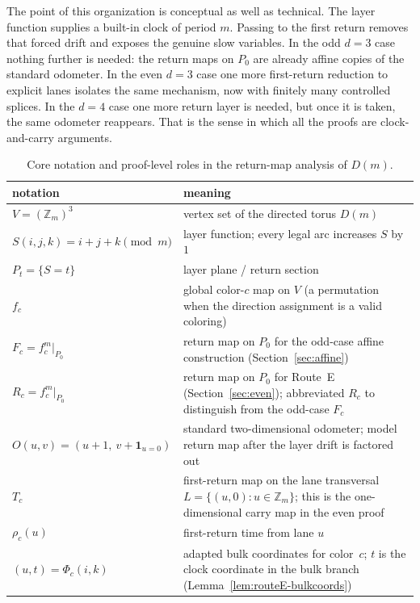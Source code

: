 \documentclass[11pt]{article}
\begin{document}
The point of this organization is conceptual as well as technical.
The layer function supplies a built-in clock of period $m$.
Passing to the first return removes that forced drift and exposes the genuine slow variables.
In the odd $d=3$ case nothing further is needed: the return maps on $P_0$ are already affine copies of the standard odometer.
In the even $d=3$ case one more first-return reduction to explicit lanes isolates the same mechanism, now with finitely many controlled splices.
In the $d=4$ case one more return layer is needed, but once it is taken, the same odometer reappears.
That is the sense in which all the proofs are clock-and-carry arguments.

\begin{table}[t]
\centering
\footnotesize
\begin{tabularx}{\textwidth}{@{}l>{\raggedright\arraybackslash}X@{}}
\toprule
notation & meaning \\
\midrule
$V=(\mathbb Z_m)^3$ & vertex set of the directed torus $D(m)$ \\
$S(i,j,k)=i+j+k\pmod m$ & layer function; every legal arc increases $S$ by $1$ \\
$P_t=\{S=t\}$ & layer plane / return section \\
$f_c$ & global color-$c$ map on $V$ (a permutation when the direction assignment is a valid coloring) \\
$F_c=f_c^m|_{P_0}$ & return map on $P_0$ for the odd-case affine construction (Section~\ref{sec:affine}) \\
$R_c=f_c^m|_{P_0}$ & return map on $P_0$ for Route~E (Section~\ref{sec:even}); abbreviated $R_c$ to distinguish from the odd-case $F_c$ \\
$O(u,v)=(u+1,\ v+\mathbf 1_{u=0})$ & standard two-dimensional odometer; model return map after the layer drift is factored out \\
$T_c$ & first-return map on the lane transversal $L=\{(u,0):u\in\mathbb Z_m\}$; this is the one-dimensional carry map in the even proof \\
$\rho_c(u)$ & first-return time from lane $u$ \\
$(u,t)=\Phi_c(i,k)$ & adapted bulk coordinates for color~$c$; $t$ is the clock coordinate in the bulk branch (Lemma~\ref{lem:routeE-bulkcoords}) \\
\bottomrule
\end{tabularx}
\caption{Core notation and proof-level roles in the return-map analysis of $D(m)$.}
\label{tab:notation}
\end{table}
\end{document}
